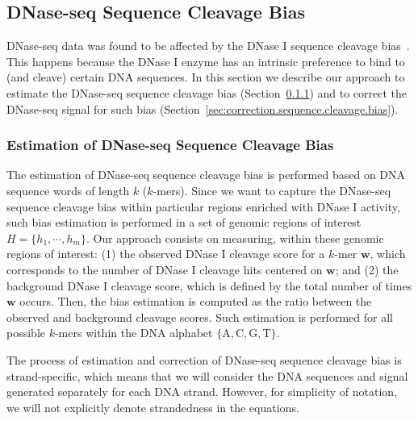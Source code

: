 \subsection{DNase-seq Sequence Cleavage Bias}
\label{sec:dnaseseq.sequence.cleavage.bias}

DNase-seq data was found to be affected by the DNase I sequence cleavage bias~\cite{he2014,meyer2014}. This happens because the DNase I enzyme has an intrinsic preference to bind to (and cleave) certain DNA sequences. In this section we describe our approach to estimate the DNase-seq sequence cleavage bias (Section~\ref{sec:estimation.sequence.cleavage.bias}) and to correct the DNase-seq signal for such bias (Section~\ref{sec:correction.sequence.cleavage.bias}).

\subsubsection{Estimation of DNase-seq Sequence Cleavage Bias}
\label{sec:estimation.sequence.cleavage.bias}

The estimation of DNase-seq sequence cleavage bias is performed based on DNA sequence words of length $k$ ($k$-mers). Since we want to capture the DNase-seq sequence cleavage bias within particular regions enriched with DNase I activity, such bias estimation is performed in a set of genomic regions of interest $H = \{{h}_{1}, \cdots, {h}_{m}\}$. Our approach consists on measuring, within these genomic regions of interest: (1) the observed DNase I cleavage score for a $k$-mer $\mathbf{w}$, which corresponds to the number of DNase I cleavage hits centered on $\mathbf{w}$; and (2) the background DNase I cleavage score, which is defined by the total number of times $\mathbf{w}$ occurs. Then, the bias estimation is computed as the ratio between the observed and background cleavage scores. Such estimation is performed for all possible $k$-mers within the DNA alphabet $\{\text{A}, \text{C}, \text{G}, \text{T}\}$.

The process of estimation and correction of DNase-seq sequence cleavage bias is strand-specific, which means that we will consider the DNA sequences and signal generated separately for each DNA strand. However, for simplicity of notation, we will not explicitly denote strandedness in the equations.

